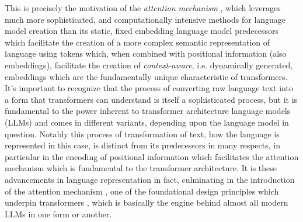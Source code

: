 \documentclass[final]{clv2025}
\begin{document}
This is precisely the motivation of the \textit{attention mechanism} \cite{bahdanau2016neuralmachinetranslationjointly} \cite{vaswani}, which leverages much more sophisticated, and computationally intensive methods for language model creation than its static, fixed embedding language model predecessors which facilitate the creation of a more complex semantic representation of language using tokens which, when combined with positional information (also embeddings), facilitate the creation of \textit{context-aware}, i.e. dynamically generated, embeddings which are the fundamentally unique characteristic of transformers. It's important to recognize that the process of converting raw language text into a form that transformers can understand is itself a sophisticated process, but it is fundamental to the power inherent to transformer architecture language models (LLMs) and comes in different variants, depending upon the language model in question. Notably this process of transformation of text, how the language is represented in this case, is distinct from its predecessors in many respects, in particular in the encoding of positional information which facilitates the attention mechanism which is fundamental to the transformer architecture. It is these advancements in language representation in fact, culminating in the introduction of the attention mechanism \cite{bahdanau2016neuralmachinetranslationjointly}, one of the foundational design principles which underpin transformers \cite{vaswani}, which is basically the engine behind almost all modern LLMs in one form or another. 
\end{document}
